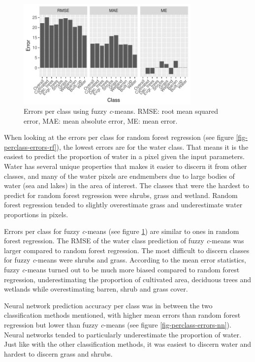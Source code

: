 \documentclass[a4paper,12pt]{scrbook}
\begin{document}
\begin{figure}
  \centering
  \includegraphics[width=0.8\textwidth]{thesis-figures/perclass-errors-cm}
  \caption{Errors per class using fuzzy \textit{c}-means. RMSE: root mean squared error, MAE: mean absolute error, ME: mean error.}
  \label{fig-perclass-errors-cm}
\end{figure}

When looking at the errors per class for random forest regression (see figure \ref{fig-perclass-errors-rf}), the lowest errors are for the water class. That means it is the easiest to predict the proportion of water in a pixel given the input parameters. Water has several unique properties that makes it easier to discern it from other classes, and many of the water pixels are endmembers due to large bodies of water (sea and lakes) in the area of interest. The classes that were the hardest to predict for random forest regression were shrubs, grass and wetland. Random forest regression tended to slightly overestimate grass and underestimate water proportions in pixels.

Errors per class for fuzzy \textit{c}-means (see figure \ref{fig-perclass-errors-cm}) are similar to ones in random forest regression. The RMSE of the water class prediction of fuzzy \textit{c}-means was larger compared to random forest regression. The most difficult to discern classes for fuzzy \textit{c}-means were shrubs and grass. According to the mean error statistics, fuzzy \textit{c}-means turned out to be much more biased compared to random forest regression, underestimating the proportion of cultivated area, deciduous trees and wetlands while overestimating barren, shrub and grass cover.

Neural network prediction accuracy per class was in between the two classification methods mentioned, with higher mean errors than random forest regression but lower than fuzzy \textit{c}-means (see figure \ref{fig-perclass-errors-nn}). Neural networks tended to particularly underestimate the proportion of water. Just like with the other classification methods, it was easiest to discern water and hardest to discern grass and shrubs.
\end{document}
